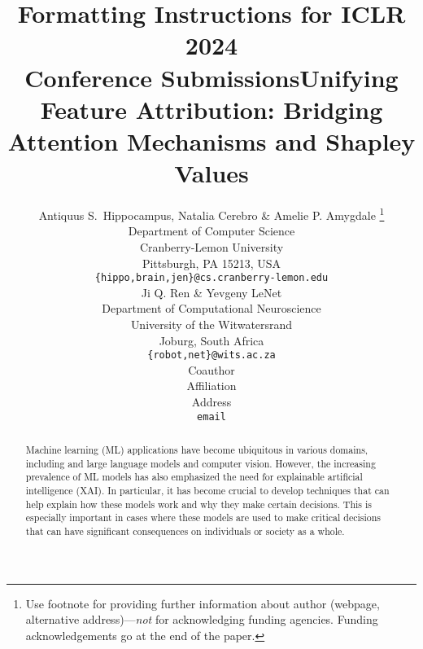 \documentclass{article} %
\title{Formatting Instructions for ICLR 2024 \\ Conference Submissions}
\author{Antiquus S.~Hippocampus, Natalia Cerebro \& Amelie P. Amygdale \thanks{ Use footnote for providing further information
		about author (webpage, alternative address)---\emph{not} for acknowledging
		funding agencies.  Funding acknowledgements go at the end of the paper.} \\
	Department of Computer Science\\
	Cranberry-Lemon University\\
	Pittsburgh, PA 15213, USA \\
	\texttt{\{hippo,brain,jen\}@cs.cranberry-lemon.edu} \\
	\And
	Ji Q. Ren \& Yevgeny LeNet \\
	Department of Computational Neuroscience \\
	University of the Witwatersrand \\
	Joburg, South Africa \\
	\texttt{\{robot,net\}@wits.ac.za} \\
	\AND
	Coauthor \\
	Affiliation \\
	Address \\
	\texttt{email}
}
\theoremstyle{bfnote}
\begin{document}
	
\title{Unifying Feature Attribution: Bridging Attention Mechanisms and Shapley Values}
\maketitle

\begin{abstract}
	Machine learning (ML) applications have become ubiquitous in various domains, including  and large language models and computer vision. However, the increasing prevalence of ML models has also emphasized the need for explainable artificial intelligence (XAI). In particular, it has become crucial to develop techniques that can help explain how these models work and why they make certain decisions. This is especially important in cases where these models are used to make critical decisions that can have significant consequences on individuals or society as a whole.
\end{abstract}
\end{document}
